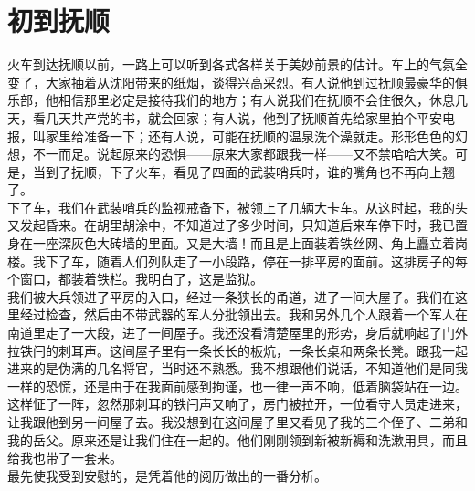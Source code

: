 \fancyhead[RO]{} %
\fancyhead[LE]{} %
\chapter*{初到抚顺}
\thispagestyle{empty}
火车到达抚顺以前，一路上可以听到各式各样关于美妙前景的估计。车上的气氛全变了，大家抽着从沈阳带来的纸烟，谈得兴高采烈。有人说他到过抚顺最豪华的俱乐部，他相信那里必定是接待我们的地方；有人说我们在抚顺不会住很久，休息几天，看几天共产党的书，就会回家；有人说，他到了抚顺首先给家里拍个平安电报，叫家里给准备一下；还有人说，可能在抚顺的温泉洗个澡就走。形形色色的幻想，不一而足。说起原来的恐惧——原来大家都跟我一样——又不禁哈哈大笑。可是，当到了抚顺，下了火车，看见了四面的武装哨兵时，谁的嘴角也不再向上翘了。\\

下了车，我们在武装哨兵的监视戒备下，被领上了几辆大卡车。从这时起，我的头又发起昏来。在胡里胡涂中，不知道过了多少时间，只知道后来车停下时，我已置身在一座深灰色大砖墙的里面。又是大墙！而且是上面装着铁丝网、角上矗立着岗楼。我下了车，随着人们列队走了一小段路，停在一排平房的面前。这排房子的每个窗口，都装着铁栏。我明白了，这是监狱。\\

我们被大兵领进了平房的入口，经过一条狭长的甬道，进了一间大屋子。我们在这里经过检查，然后由不带武器的军人分批领出去。我和另外几个人跟着一个军人在南道里走了一大段，进了一间屋子。我还没看清楚屋里的形势，身后就响起了门外拉铁闩的刺耳声。这间屋子里有一条长长的板炕，一条长桌和两条长凳。跟我一起进来的是伪满的几名将官，当时还不熟悉。我不想跟他们说话，不知道他们是同我一样的恐慌，还是由于在我面前感到拘谨，也一律一声不响，低着脑袋站在一边。这样怔了一阵，忽然那刺耳的铁闩声又响了，房门被拉开，一位看守人员走进来，让我跟他到另一间屋子去。我没想到在这间屋子里又看见了我的三个侄子、二弟和我的岳父。原来还是让我们住在一起的。他们刚刚领到新被新褥和洗漱用具，而且给我也带了一套来。\\

最先使我受到安慰的，是凭着他的阅历做出的一番分析。\\

